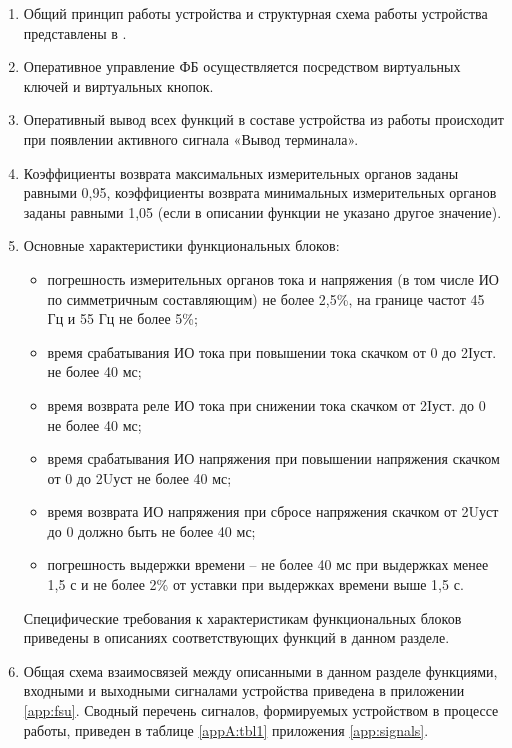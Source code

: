 \begin{enumerate}[label=\arabic{section}.\arabic{subsection}.\arabic*, labelsep=4pt, leftmargin=0pt, itemindent=57pt]
\item
Общий принцип работы устройства и структурная схема работы устройства представлены в \ManualUnitGeneral.

\item
Оперативное управление ФБ осуществляется посредством виртуальных ключей и виртуальных кнопок.

\item
Оперативный вывод всех функций в составе устройства из работы происходит при появлении активного сигнала «Вывод терминала».

\item
Коэффициенты возврата максимальных измерительных органов заданы равными 0,95, коэффициенты возврата минимальных измерительных органов заданы равными 1,05 (если в описании функции не указано другое значение).

\item
Основные характеристики функциональных блоков:
\begin{itemize}
    \item погрешность измерительных органов тока и напряжения (в том числе ИО по симметричным составляющим) не более 2,5\%, на границе частот 45 Гц и 55 Гц не более 5\%;
    \item время срабатывания ИО тока при повышении тока скачком от 0 до 2Iуст. не более 40 мс;
    \item время возврата реле ИО тока при снижении тока скачком от 2Iуст. до 0 не более 40 мс;
    \item время срабатывания ИО напряжения при повышении напряжения скачком от 0 до 2Uуст не более 40 мс;
    \item время возврата ИО напряжения при сбросе напряжения скачком от 2Uуст до 0 должно быть не более 40 мс; 
    \item погрешность выдержки времени -- не более 40 мс при выдержках менее 1,5 с и не более 2\% от уставки при выдержках времени выше 1,5 с.
\end{itemize}
Специфические требования к характеристикам функциональных блоков приведены в описаниях соответствующих функций в данном разделе.

\item
Общая схема взаимосвязей между описанными в данном разделе функциями, входными и выходными сигналами устройства приведена в приложении \ref{app:fsu}.
Сводный перечень сигналов, формируемых устройством в процессе работы, приведен в таблице \ref{appA:tbl1} приложения \ref{app:signals}.

\end{enumerate}